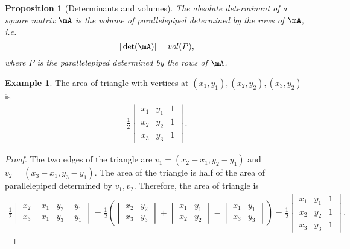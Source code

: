\documentclass[11pt]{article}
\theoremstyle{plain}
\newtheorem{prop}{Proposition}
\theoremstyle{definition}
\newtheorem{example}{Example}
\begin{document}
\begin{prop}[Determinants and volumes]
The absolute determinant of a square matrix $\mA$ is the volume of parallelepiped determined by the rows of $\mA$, i.e.\
	\[ |\det(\mA)| = vol(P), \]
	where $P$ is the parallelepiped determined by the rows of $\mA$.
\end{prop}

\begin{example}
	The area of triangle with vertices at $(x_1,y_1), (x_2,y_2), (x_3,y_2)$ is
	\begin{align}
		\frac{1}{2} \begin{vmatrix}
			x_1 & y_1 & 1\\
			x_2 & y_2 & 1\\
			x_3 & y_3 & 1
		\end{vmatrix}.
	\end{align}
	
	\begin{proof}
		The two edges of the triangle are $v_1 = (x_2 - x_1, y_2 -y_1)$ and $v_2 = (x_3 - x_1, y_3 -y_1)$. The area of the triangle is half of the area of parallelepiped determined by $v_1, v_2$. Therefore, the area of triangle is 
		\begin{align}
			\frac{1}{2} \begin{vmatrix}
				x_2 - x_1 &  y_2 - y_1\\
				x_3 - x_1& y_3 -y_1
			\end{vmatrix} =  \frac{1}{2} \left(  \begin{vmatrix}
				x_2  &  y_2 \\
				x_3 & y_3
			\end{vmatrix} + \begin{vmatrix}
				x_1 &  y_1\\
				x_2& y_2
			\end{vmatrix}  - \begin{vmatrix}
				x_1 &  y_1\\
				x_3 & y_3 
			\end{vmatrix}    \right) = \frac{1}{2} \begin{vmatrix}
			x_1 & y_1 & 1\\
			x_2 & y_2 & 1\\
			x_3 & y_3 & 1
		\end{vmatrix}.
		\end{align}
	\end{proof}
\end{example}
\end{document}
